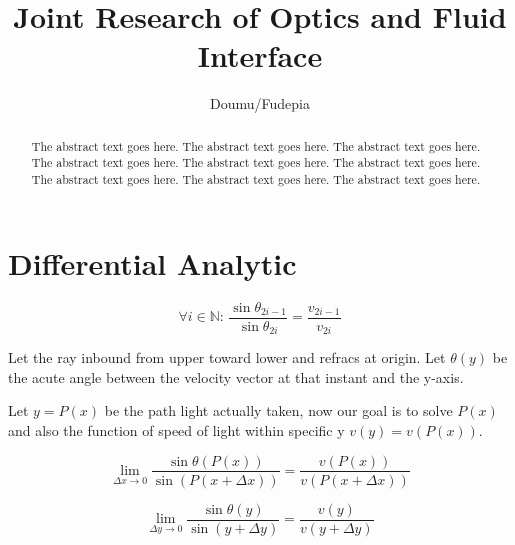 \documentclass[preprint]{ptephy_v1}%
\begin{document}

\title{Joint Research of Optics and Fluid Interface}


\author{Doumu/Fudepia}

\begin{abstract}
    The abstract text goes here. The abstract text goes here. The abstract text goes here.
    The abstract text goes here. The abstract text goes here. The abstract text goes here.
    The abstract text goes here. The abstract text goes here. The abstract text goes here.
\end{abstract}



\maketitle

\section{Differential Analytic}

\begin{figure}
    
\end{figure}
\begin{equation}
    \forall i\in\mathbb{N}:\,
    \frac{\sin\theta_{2i-1}}{\sin\theta_{2i}}=\frac{v_{2i-1}}{v_{2i}}
\end{equation}

Let the ray inbound from upper toward lower and refracs at origin. Let $\theta(y)$ be the acute angle between the velocity vector at that instant and the y-axis.

Let $y=P(x)$ be the path light actually taken, now our goal is to solve $P(x)$ and also the function of speed of light within specific y $v(y)=v(P(x))$.

\begin{equation}
    \lim_{\Delta x\to 0}
    \frac{\sin\theta(P(x))}{\sin(P(x+\Delta x))}=\frac{v(P(x))}{v(P(x+\Delta x))}
\end{equation}

\begin{equation}
    \lim_{\Delta y\to 0}
    \frac{\sin\theta(y)}{\sin(y+\Delta y)}=\frac{v(y)}{v(y+\Delta y)}
\end{equation}
\end{document}
